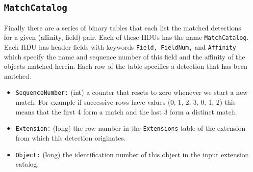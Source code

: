 \documentclass[11pt,preprint,flushrt]{aastex}
\begin{document}
\subsection{\tt MatchCatalog}
Finally there are a series of binary tables that each list the matched detections for a given (affinity, field) pair.  Each of these HDUs has the name {\tt MatchCatalog}.  Each HDU has header fields with keywords {\tt Field, FieldNum,} and {\tt Affinity} which specify the name and sequence number of this field and the affinity of the objects matched herein.  Each row of the table specifies a detection that has been matched.
\begin{itemize}
\item {\tt SequenceNumber:} (int) a counter that resets to zero whenever we start a new match.  For example if successive rows have values (0, 1, 2, 3, 0, 1, 2) this means that the first 4 form a match and the last 3 form a distinct match.
\item {\tt Extension:} (long) the row number in the {\tt Extensions} table of the extension from which this detection originates.
\item {\tt Object:} (long) the identification number of this object in the input extension catalog.
\end{itemize}
\end{document}
